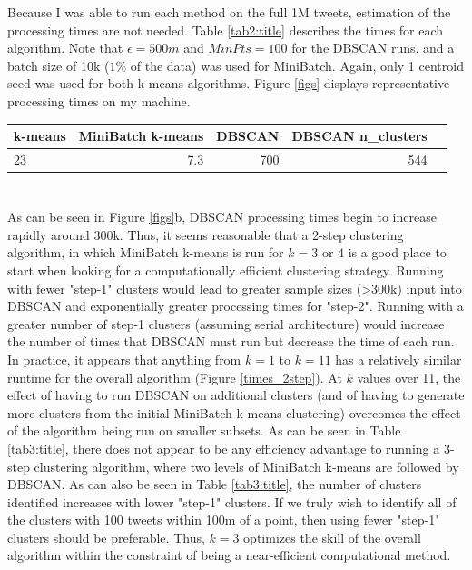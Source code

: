 \documentclass[12pt]{article}
\begin{document}
	Because I was able to run each method on the full 1M tweets, estimation of the processing times are not needed. Table \ref{tab2:title} describes the times for each algorithm. Note that $\epsilon=500m$ and $MinPts = 100$ for the DBSCAN runs, and a batch size of 10k ($1\%$ of the data) was used for MiniBatch. Again, only 1 centroid seed was used for both k-means algorithms. Figure \ref{figs} displays representative processing times on my machine.
	
\begin{minipage}\linewidth
    \centering	
     \label{tab2:title} 
	\begin{tabular}{lrrrr}
    \toprule
    k-means & MiniBatch k-means &      DBSCAN &  DBSCAN n\_clusters \\
    \midrule
    23 &              7.3 &  700 &                544 \\
    \bottomrule
    \end{tabular}
    \end{minipage}
    
\section{}
	As can be seen in Figure \ref{figs}b, DBSCAN processing times begin to increase rapidly around 300k. Thus, it seems reasonable that a 2-step clustering algorithm, in which MiniBatch k-means is run for $k=3$ or $4$ is a good place to start when looking for a computationally efficient clustering strategy. Running with fewer "step-1" clusters would lead to greater sample sizes (>300k) input into DBSCAN and exponentially greater processing times for "step-2". Running with a greater number of step-1 clusters (assuming serial architecture) would increase the number of times that DBSCAN must run but decrease the time of each run. In practice, it appears that anything from $k=1$ to $k=11$ has a relatively similar runtime for the overall algorithm (Figure \ref{times_2step}). At $k$ values over 11, the effect of having to run DBSCAN on additional clusters (and of having to generate more clusters from the initial MiniBatch k-means clustering) overcomes the effect of the algorithm being run on smaller subsets. As can be seen in Table \ref{tab3:title}, there does not appear to be any efficiency advantage to running a 3-step clustering algorithm, where two levels of MiniBatch k-means are followed by DBSCAN. As can also be seen in Table \ref{tab3:title}, the number of clusters identified increases with lower "step-1" clusters. If we truly wish to identify all of the clusters with 100 tweets within 100m of a point, then using fewer "step-1" clusters should be preferable. Thus, $k=3$ optimizes the skill of the overall algorithm within the constraint of being a near-efficient computational method.
	
\end{document}

